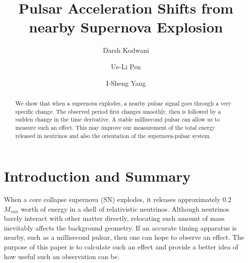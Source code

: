 \documentclass[aps,showpacs,onecolumn,floats,prd,superscriptaddress,nofootinbib]{revtex4}
\begin{document}
\title{Pulsar Acceleration Shifts from nearby Supernova Explosion}

\author{Darsh Kodwani}

\author{Ue-Li Pen}

\author{I-Sheng Yang}

\begin{abstract}
We show that when a supernova explodes, a nearby pulsar signal goes through a very specific change. The observed period first changes smoothly, then is followed by a sudden change in the time derivative. A stable millisecond pulsar can allow us to measure such an effect. This may improve our measurement of the total energy released in neutrinos and also the orientation of the supernova-pulsar system. 
\end{abstract}

\maketitle

\section{Introduction and Summary}

When a core collapse supernova (SN) explodes, it releases approximately 0.2 $M_{sun}$ worth of energy in a shell of relativistic neutrinos. Although neutrinos barely interact with other matter directly, relocating such amount of mass inevitably affects the background geometry. If an accurate timing apparatus is nearby, such as a millisecond pulsar, then one can hope to observe an effect. The purpose of this paper is to calculate such an effect and provide a better idea of how useful such an observation can be.
\end{document}
